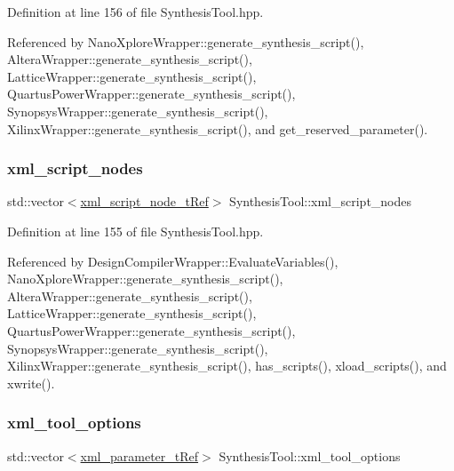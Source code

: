Definition at line 156 of file Synthesis\+Tool.\+hpp.



Referenced by Nano\+Xplore\+Wrapper\+::generate\+\_\+synthesis\+\_\+script(), Altera\+Wrapper\+::generate\+\_\+synthesis\+\_\+script(), Lattice\+Wrapper\+::generate\+\_\+synthesis\+\_\+script(), Quartus\+Power\+Wrapper\+::generate\+\_\+synthesis\+\_\+script(), Synopsys\+Wrapper\+::generate\+\_\+synthesis\+\_\+script(), Xilinx\+Wrapper\+::generate\+\_\+synthesis\+\_\+script(), and get\+\_\+reserved\+\_\+parameter().

\mbox{\label{classSynthesisTool_abacae2cf584de74220837a216beafeef}} 
\subsubsection{\texorpdfstring{xml\+\_\+script\+\_\+nodes}{xml\_script\_nodes}}
{\footnotesize\ttfamily std\+::vector$<$\hyperlink{xml__script__command_8hpp_a1fe3d50ade66bc35e41be9b68bbbcd02}{xml\+\_\+script\+\_\+node\+\_\+t\+Ref}$>$ Synthesis\+Tool\+::xml\+\_\+script\+\_\+nodes\hspace{0.3cm}{\ttfamily [protected]}}



Definition at line 155 of file Synthesis\+Tool.\+hpp.



Referenced by Design\+Compiler\+Wrapper\+::\+Evaluate\+Variables(), Nano\+Xplore\+Wrapper\+::generate\+\_\+synthesis\+\_\+script(), Altera\+Wrapper\+::generate\+\_\+synthesis\+\_\+script(), Lattice\+Wrapper\+::generate\+\_\+synthesis\+\_\+script(), Quartus\+Power\+Wrapper\+::generate\+\_\+synthesis\+\_\+script(), Synopsys\+Wrapper\+::generate\+\_\+synthesis\+\_\+script(), Xilinx\+Wrapper\+::generate\+\_\+synthesis\+\_\+script(), has\+\_\+scripts(), xload\+\_\+scripts(), and xwrite().

\mbox{\label{classSynthesisTool_a03e683138b6ceb7fd0936586278c2f4b}} 
\subsubsection{\texorpdfstring{xml\+\_\+tool\+\_\+options}{xml\_tool\_options}}
{\footnotesize\ttfamily std\+::vector$<$\hyperlink{xml__script__command_8hpp_aec6b63d2a298703bc3ead113609b27a6}{xml\+\_\+parameter\+\_\+t\+Ref}$>$ Synthesis\+Tool\+::xml\+\_\+tool\+\_\+options\hspace{0.3cm}{\ttfamily [protected]}}




